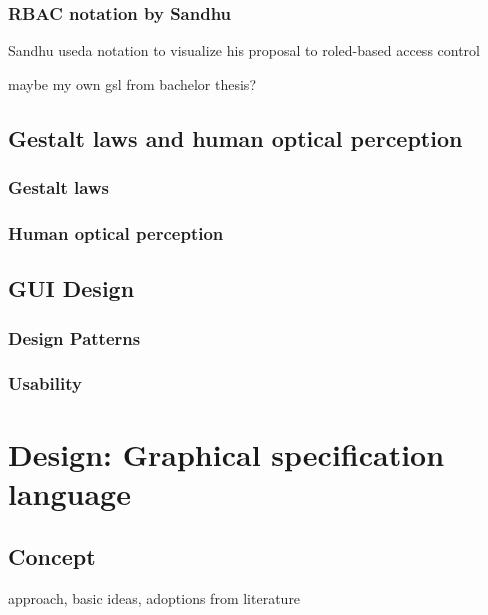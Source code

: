 \documentclass[twoside, openright, 12pt]{book}
\begin{document}
\subsection{RBAC notation by Sandhu}
\label{RBAC_notation}
Sandhu useda notation to visualize his proposal to roled-based access control

maybe my own gsl from bachelor thesis?



\section{Gestalt laws and human optical perception}
\label{gestalt_laws_and_human_optical_perception}


\subsection{Gestalt laws}
\label{gestalt_laws}


\subsection{Human optical perception}
\label{human_optical_perception}




\section{GUI Design}
\label{gui_design}


\subsection{Design Patterns}
\label{design_patterns}


\subsection{Usability}
\label{usability}




\cleardoublepage
\chapter{Design: Graphical specification language}
\label{gsl_design}


\section{Concept}
\label{gsl_concept}
approach, basic ideas, adoptions from literature
\end{document}
